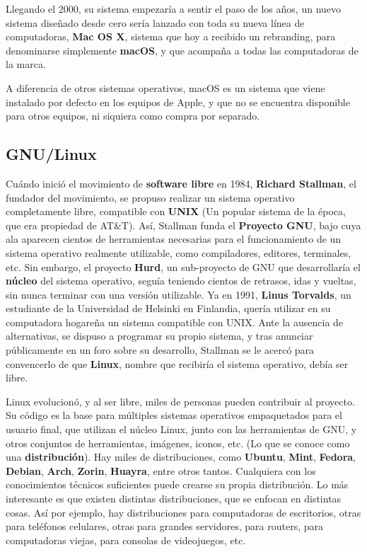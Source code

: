 Llegando el 2000, su sistema empezaría a sentir el paso de los años, un nuevo
sistema diseñado desde cero sería lanzado con toda su nueva línea de
computadoras, \textbf{Mac OS X}, sistema que hoy a recibido un rebranding, para
denominarse simplemente \textbf{macOS}, y que acompaña a todas las computadoras
de la marca.

A diferencia de otros sistemas operativos, macOS es un sistema que viene
instalado por defecto en los equipos de Apple, y que no se encuentra disponible
para otros equipos, ni siquiera como compra por separado.


\subsection*{GNU/Linux}

Cuándo inició el movimiento de \textbf{software libre} en 1984, \textbf{Richard
Stallman}, el fundador del movimiento, se propuso realizar un sistema operativo
completamente libre, compatible con \textbf{UNIX} (Un popular sistema de la
época, que era propiedad de AT\&T). Así, Stallman funda el \textbf{Proyecto
GNU}, bajo cuya ala aparecen cientos de herramientas necesarias para el
funcionamiento de un sistema operativo realmente utilizable, como compiladores,
editores, terminales, etc. Sin embargo, el proyecto \textbf{Hurd}, un
sub-proyecto de GNU que desarrollaría el \textbf{núcleo} del sistema operativo,
seguía teniendo cientos de retrasos, idas y vueltas, sin nunca terminar con una
versión utilizable. Ya en 1991, \textbf{Linus Torvalds}, un estudiante de la
Universidad de Helsinki en Finlandia, quería utilizar en su computadora hogareña
un sistema compatible con UNIX. Ante la ausencia de alternativas, se dispuso a
programar su propio sistema, y tras anunciar públicamente en un foro sobre su
desarrollo, Stallman se le acercó para convencerlo de que \textbf{Linux}, nombre
que recibiría el sistema operativo, debía ser libre.

Linux evolucionó, y al ser libre, miles de personas pueden contribuir al
proyecto. Su código es la base para múltiples sistemas operativos empaquetados
para el usuario final, que utilizan el núcleo Linux, junto con las herramientas
de GNU, y otros conjuntos de herramientas, imágenes, iconos, etc. (Lo que se
conoce como una \textbf{distribución}). Hay miles de distribuciones, como
\textbf{Ubuntu}, \textbf{Mint}, \textbf{Fedora}, \textbf{Debian}, \textbf{Arch},
\textbf{Zorin}, \textbf{Huayra}, entre otros tantos. Cualquiera con los
conocimientos técnicos suficientes puede crearse su propia distribución. Lo más
interesante es que existen distintas distribuciones, que se enfocan en distintas
cosas. Así por ejemplo, hay distribuciones para computadoras de escritorios,
otras para teléfonos celulares, otras para grandes servidores, para routers,
para computadoras viejas, para consolas de videojuegos, etc.

